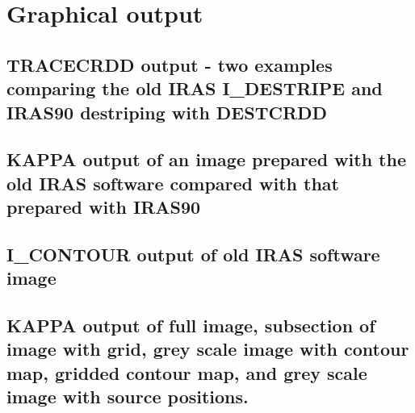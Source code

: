 \section{Graphical output}
\label{a:a}
\subsection{TRACECRDD output - two examples comparing the old IRAS 
I\_DESTRIPE and IRAS90 destriping with DESTCRDD}
\label{a:a1}
\subsection{KAPPA output of an image prepared with the old IRAS software 
compared with that prepared with IRAS90}
\label{a:a2}
\subsection{I\_CONTOUR  output of old IRAS software image}
\label{a:a3}
\subsection{KAPPA output of  full image, subsection of image with grid, grey 
scale image with contour map, gridded contour map, and grey scale image with
source positions.}
\label{a:a4}

%
 
\newpage
\addtocounter{page}{+9}

\newpage
